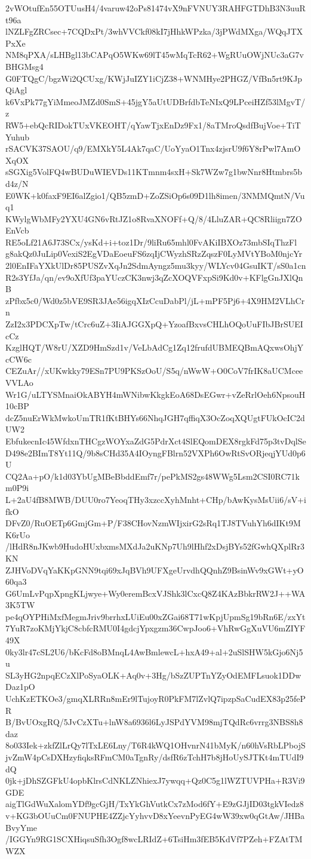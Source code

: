 2vWOtufEn55OTUusH4/4varuw42oPs81474vX9nFVNUY3RAHFGTDhB3N3uuRt96a
lNZLFgZRCsec+7CQDxPt/3whVVCkf08kI7jHhkWPzka/3jPWdMXga/WQqJTXPxXe
NM8qPXA/sLHBgl13bCAPqO5WKw69lT45wMqTcR62+WgRUuOWjNUc3aG7vBHGMsg4
G0FTQgC/bgzWi2QCUxg/KWjJuIZY1iCjZ38+WNMHye2PHGZ/VfBn5rt9KJpQiAgl
k6VxPk77gYiMmeoJMZd0SmS+45jgY5aUtUDBrfdbTeNIxQ9LPceiHZf53lMgvT/z
RW5+ebQcRIDokTUxVKEOHT/qYawTjxEnDz9Fx1/8aTMroQsdfBujVoe+TiTYuhub
rSACVK37SAOU/q9/EMXkY5L4Ak7qaC/UoYyaO1Tnx4zjsrU9f6Y8rPwl7AmOXqOX
sSGXig5VolFQ4wBUDuWIEVDs11KTmnm4sxH+Sk7WZw7g1bwNnr8Htmbrs5bd4z/N
E0WK+k0faxF9EI6alZgio1/QB5zmD+ZoZSiOp6s09D1lh8imen/3NMMQmtN/Vuq1
KWylgWbMFy2YXU4GN6vRtJZ1o8RvaXNOFf+Q/8/4LluZAR+QC8Rliign7ZOEnVcb
RE5oLf21A6J73SCx/ysKd+i+toz1Dr/9liRu65mhl0FvAKiIBXOz73mbSIqThzFl
g8akQz0JuLip0VexiS2EgVDaEoeuFS6zqIjCWyzhSRzZqszF0LyMVtYBoM0njcYr
2l0EnIFaYXkUlDr85PUSZvXqJn2SdmAyngz5mu3kyy/WLYcv04GsuIKT/sS0a1cn
R2s3YfJa/qn/ev9oXfUf3paYUczCK3nwj3qZcXOQVFxpSi9Kd0v+KFlgGnJXlQnB
zPfbx5c0/Wd0z5bVE9SR3JAe56igqXIzCcuDabPl/jL+mPF5Pj6+4X9HM2VLhCrn
ZzI2x3PDCXpTw/tCrc6uZ+3IiAJGGXpQ+YzoafBxvsCHLhOQoUuFIbJBrSUEIcCz
KzglHQT/W8rU/XZD9HmSzd1v/VeLbAdCg1Zq12frufdUBMEQBmAQxwsOhjYcCW6c
CEZuAr//xUKwkky79ESn7PU9PKSzOoU/S5q/nWwW+O0CoV7frIK8aUCMceeVVLAo
Wr1G/uLTYSMnaiOkABYH4mWNibwKkgkEoA68DsEGwr+vZeRrlOeh6NpsouH10cBP
dcZ5nuErWkMwkoUmTR1fKtBHYs66NhqJGH7qffiqX3OcZoqXQUgtFUkOcIC2dUW2
EbfukecnIc45WfdxnTHCgzWOYxaZdG5PdrXct4SlEQomDEX8rgkFd75p3tvDqlSe
D498e2BImT8Yt11Q/9b8sCHd35A4IOyngFBlrn52VXPh6OwRtSvORjeqjYUd0p6U
CQ2Aa+pO/k1d03YbUgMBeBbddEmf7r/pePkMS2gs48WWg5Lsm2CSI0RC71km0P9i
L+2aU4fB8MWB/DUU0ro7YeoqTHy3xzccXyhMnht+CHp/bAwKysMsUii6/sV+ifkO
DFvZ0/RuOETp6GmjGm+P/F38CHovNzmWIjxirG2sRq1TJ8TVuhYh6dIKt9MK6rUo
/lHdR8nJKwb9HudoHUxbxmsMXdJa2uKNp7Uh9lHhf2xDsjBYs52fGwhQXplRr3KN
ZJHVoDVqYaKKpGNN9tqi69xJqBVh9UFXgeUrvdhQQnhZ9BsinWv9xGWt+yO60qa3
G6UmLvPqpXpngKLjwye+Wy0eremBcxVJShk3lCxcQ8Z4KAzBbkrRW2J++WA3K5TW
pe4qOYPHiMxfMegmJriv9brrhxLUiEu00xZGai68T71wKpjUpmSg19bRn6E/zxYt
7YuR7zoKMjYkjC8cbfcRMU0I4gdcjYpxgzm36CwpJoo6+VhRwGgXuVU6mZIYF49X
0ky3lr47cSL2U6/bKcFd8oBMnqL4AwBmlewcL+hxA49+al+2uSlSHW5kGjo6Nj5u
SL3yHG2npqECzXlPoSyaOLK+Aq0v+3Hg/bSzZUPTnYZyOdEMFLsuok1DDwDaz1pO
UchKzETKOe3/gmqXLRRn8mEr9lTujoyR0PkFM7lZvlQ7ipzpSaCudEX83p25fePR
B/BvUOxgRQ/5JvCzXTu+lnW8a6936l6LyJSPdYVM98mjTQdRc6vrrg3NBS8h8daz
8o033Iek+zkfZlLrQy7lTxLE6Lny/T6R4kWQ1OHvnrN41bMyK/n60hVsRbLPbojS
jvZmW4pCsDXHzyfiqksRFmCM0aTgnRy/dsfR6zTchH7b8jHoUySJTKt4mTUdI9dQ
0jk+jDhSZGFkU4opbKlrsCdNKLZNhiexJ7ywqq+Qz0C5g1lWZTUVPHa+R3Vi9GDE
aigTlGdWuXalomYDf9gcGjH/TxYkGhVutkCx7zMod6fY+E9zGJjID03tgkVIedz8
v+KG3bOUuCm0FNUPHE4ZZjcYyhvvD8xYeevnPyEG4wW39xw0qGtAw/JHBaBvyYme
/IGGYn9RG1SCXHiqsuSfh3Ogf8wcLRIdZ+6TsiHm3fEB5KdVf7PZeh+FZAtTMWZX
